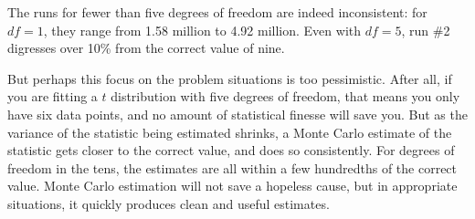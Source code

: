 \startonecol
\vspace{\baselineskip}
\hspace{-8.0cm}
\vspace{\baselineskip}
\endonecol

The runs for fewer than five degrees of freedom are indeed inconsistent:
for $df = 1$, they range from 1.58 million to 4.92 million. Even with
$df = 5$, run \#2 digresses over 10\% from the correct value of nine.

But perhaps this focus on the problem situations is too pessimistic.
After all, if you are fitting a $t$ distribution with five degrees
of freedom, that means you only have six data points, and no amount of
statistical finesse will save you. But as the variance of the statistic being
estimated shrinks, a Monte Carlo estimate of the statistic gets closer to
the correct value, and does so consistently. For degrees of freedom in the
tens, the estimates are all within a few hundredths of the correct value.
Monte Carlo estimation will not save a hopeless cause, but in
appropriate situations, it quickly produces clean and useful estimates.


